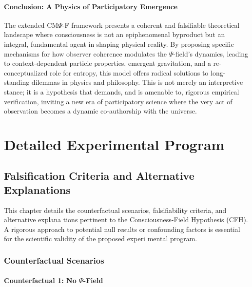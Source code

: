 \documentclass{report}
\begin{document}
\subsection{Conclusion: A Physics of Participatory Emergence}
\label{subsec:conclusion-participatory}

The extended CM$\Psi$-F framework presents a coherent and falsifiable theoretical landscape where consciousness is not an epiphenomenal byproduct but an integral, fundamental agent in shaping physical reality. By proposing specific mechanisms for how observer coherence modulates the $\Psi$-field's dynamics, leading to context-dependent particle properties, emergent gravitation, and a re-conceptualized role for entropy, this model offers radical solutions to long-standing dilemmas in physics and philosophy. This is not
merely an interpretive stance; it is a hypothesis that demands, and is amenable to, rigorous empirical verification, inviting a new era of participatory science where the very act of observation becomes a dynamic co-authorship with the universe.

\part{Detailed Experimental Program}
\label{part:experimental_program}

\chapter{Falsification Criteria and Alternative Explanations} %
\label{ch:falsification_cfh_main}
This chapter details the counterfactual scenarios, falsifiability criteria, and alternative explana tions pertinent to the Consciousness-Field Hypothesis (CFH). A rigorous approach to potential
null results or confounding factors is essential for the scientific validity of the proposed experi mental program.

\section{Counterfactual Scenarios}
\label{sec:counterfactual_scenarios_cfh_main}

\subsection{Counterfactual 1: No $\Psi$-Field}
\label{subsec:counterfactual_no_psi_main}
\end{document}
